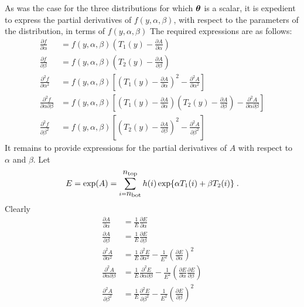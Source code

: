 As was the case for the three distributions for which $\mbox{$\boldsymbol{\theta}$}$ is
a scalar, it is expedient to express the partial derivatives of
$f(y,\alpha,\beta)$, with respect to the parameters of the distribution,
in terms of $f(y,\alpha,\beta)$  The required expressions are as follows:
\begin{align*}
\frac{\partial f}{\partial \alpha} &=
f(y,\alpha,\beta) \left ( T_1(y) - \frac{\partial A}{\partial \alpha} \right )\\
\frac{\partial f}{\partial \beta} &=
f(y,\alpha,\beta) \left ( T_2(y) - \frac{\partial A}{\partial \beta} \right )\\
\frac{\partial^2 f}{\partial \alpha^2} &=
f(y,\alpha,\beta) \left [ \left ( T_1(y) - \frac{\partial A}{\partial \alpha} \right )^2
- \frac{\partial^2 A}{\partial \alpha^2} \right ]\\
\frac{\partial^2 f}{\partial \alpha \partial \beta} &=
f(y,\alpha,\beta) \left [
\left ( T_1(y) - \frac{\partial A}{\partial \alpha} \right )
\left ( T_2(y) - \frac{\partial A}{\partial \beta} \right )
- \frac{\partial^2 A}{\partial \alpha \partial \beta} \right ] \\
\frac{\partial^2 f}{\partial \beta^2} &=
f(y,\alpha,\beta) \left [ \left ( T_2(y) - \frac{\partial A}{\partial \beta} \right )^2
- \frac{\partial^2 A}{\partial \beta^2} \right ]
\end{align*}
\newpage
It remains to provide expressions for the partial derivatives of $A$ with
respect to $\alpha$ and $\beta$.  Let
\[
E = \exp(A) = \sum_{i=\mbox{$n_{\textup{\textrm{bot}}}$}}^{\mbox{$n_{\textup{\textrm{top}}}$}} h(i)
                       \exp\{\alpha T_1(i) + \beta T_2(i) \} \; .
\]
Clearly
\begin{align*}
\frac{\partial A}{\partial \alpha} &= \frac{1}{E} \frac{\partial E}{\partial \alpha} \\
\frac{\partial A}{\partial \beta} &= \frac{1}{E} \frac{\partial E}{\partial \beta} \\
\frac{\partial^2 A}{\partial \alpha^2} &=
\frac{1}{E} \frac{\partial^2 E}{\partial \alpha^2} - \frac{1}{E^2}
\left (\frac{\partial E}{\partial \alpha} \right )^2 \\
\frac{\partial^2 A}{\partial \alpha \partial \beta} &=
\frac{1}{E} \frac{\partial^2 E}{\partial \alpha \partial \beta} - \frac{1}{E^2}
\left (\frac{\partial E}{\partial \alpha}
\frac{\partial E}{\partial \beta} \right ) \\
\frac{\partial^2 A}{\partial \beta^2} &=
\frac{1}{E} \frac{\partial^2 E}{\partial \beta^2} - \frac{1}{E^2}
\left (\frac{\partial E}{\partial \beta} \right )^2
\end{align*}
